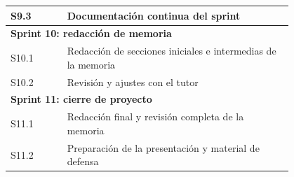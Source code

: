 \documentclass[
11pt, %
]{charter}
\begin{document}
\begin{longtable}{|l|p{0.8\linewidth}|}
S9.3 & Documentación continua del sprint \\ \hline
\multicolumn{2}{l}{\textbf{Sprint 10: redacción de memoria}} \\
S10.1 & Redacción de secciones iniciales e intermedias de la memoria \\
S10.2 & Revisión y ajustes con el tutor \\ \hline
\multicolumn{2}{l}{\textbf{Sprint 11: cierre de proyecto}} \\
S11.1 & Redacción final y revisión completa de la memoria \\
S11.2 & Preparación de la presentación y material de defensa \\
\end{longtable}

\vspace{0.5cm}
\end{document}
